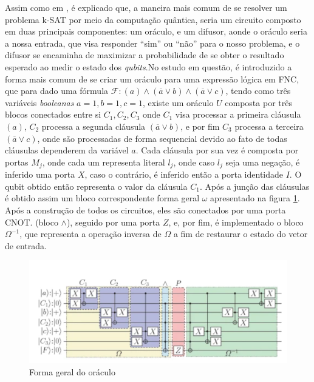 \documentclass[12pt]{article}
\begin{document}
Assim como em \cite{parallelAndDistributed}, é explicado que, a maneira mais comum de se resolver um problema k-SAT por meio da computação quântica, seria um circuito composto em duas principais componentes: um oráculo, e um difusor, aonde o oráculo seria a nossa entrada, que visa responder ``sim'' ou ``não'' para o nosso problema, e o difusor se encaminha de maximizar a probabilidade de se obter o resultado esperado ao medir o estado dos \textit{qubits}.No estudo em questão, é introduzido a forma mais comum de se criar um oráculo para uma expressão lógica em FNC, que para dado uma fórmula $
\mathcal {F}: (a) \wedge (\overline{a} \vee b) \wedge (\overline{a} \vee c)
$, tendo como três variáveis \textit{booleanas} $a=1, b=1, c=1$, existe um oráculo ${U}$ composta por três blocos conectados entre si $C_1, C_2, C_3$ onde $C_1$ visa processar a primeira cláusula $(a)$, $C_2$ processa a segunda cláusula
$(\overline{a} \vee b)$, e por fim $C_3$ processa a terceira $(\overline{a} \vee c)$, onde são processadas de forma sequencial devido ao fato de todas cláusulas dependerem da variável $a$.
Cada cláusula por sua vez é composta por portas $M_j$, onde cada um representa literal $l_j$, onde caso $l_j$ seja uma negação, é inferido uma porta $X$, caso o contrário, é inferido então a porta identidade $I$. O qubit obtido então representa o valor da cláusula $C_1$. Após a junção das cláusulas é obtido assim um bloco correspondente forma geral $\omega$ apresentado na figura \ref{fig:oraculo_forma_geral}. Após a construção de todos os circuitos, eles são conectados por uma porta CNOT. (bloco $\wedge$), seguido por uma porta $Z$, e, por fim, é implementado o bloco $\Omega ^{-1}$, que representa a operação inversa de $\Omega$ a fim de restaurar o estado do vetor de entrada.
\begin{figure}
    \centering
    \includegraphics[width=0.7\linewidth]{oraculo_convencional.png}
    \caption{Forma geral do oráculo \cite{parallelAndDistributed}}
\label{fig:oraculo_forma_geral}
\end{figure}
\end{document}
